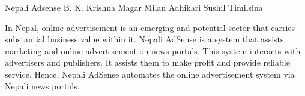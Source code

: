  \begin{conf-abstract}[]
 {Nepali Adsense}
 {B. K. Krishna Magar
 	Milan Adhikari
 	Sushil Timilsina
 }
{}

In Nepal, online advertisement is an emerging and potential sector that carries substantial business value within it. Nepali AdSense is a system that assists marketing and online advertisement on news portals. This system interacts with advertisers and publishers. It assists them to make profit and provide reliable service. Hence, Nepali AdSense automates the online advertisement system via Nepali news portals.

 \end{conf-abstract}